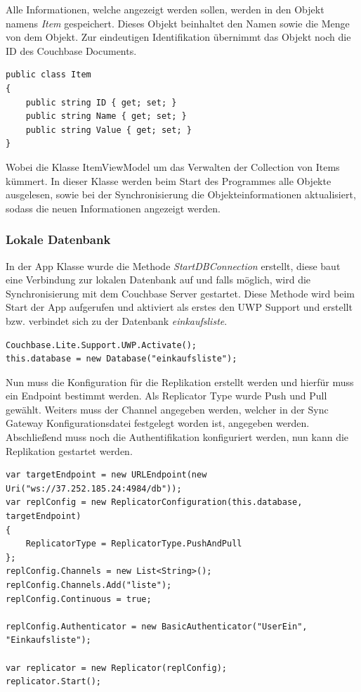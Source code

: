 Alle Informationen, welche angezeigt werden sollen, werden in den Objekt namens \textit{Item} gespeichert. Dieses Objekt beinhaltet den Namen sowie die Menge von dem Objekt. Zur eindeutigen Identifikation übernimmt das Objekt noch die ID des Couchbase Documents.

\begin{verbatim}
public class Item
{
	public string ID { get; set; }
	public string Name { get; set; }
	public string Value { get; set; }
}
\end{verbatim}

Wobei die Klasse ItemViewModel um das Verwalten der Collection von Items kümmert. In dieser Klasse werden beim Start des Programmes alle Objekte ausgelesen, sowie bei der Synchronisierung die Objekteinformationen aktualisiert, sodass die neuen Informationen angezeigt werden. \cite{listview}

\subsubsection{Lokale Datenbank}

In der App Klasse wurde die Methode \textit{StartDBConnection} erstellt, diese baut eine Verbindung zur lokalen Datenbank auf und falls möglich, wird die Synchronisierung mit dem Couchbase Server gestartet. Diese Methode wird beim Start der App aufgerufen und aktiviert als erstes den UWP Support und erstellt bzw. verbindet sich zu der Datenbank \textit{einkaufsliste}.


\begin{verbatim}
Couchbase.Lite.Support.UWP.Activate();
this.database = new Database("einkaufsliste");
\end{verbatim}

Nun muss die Konfiguration für die Replikation erstellt werden und hierfür muss ein Endpoint bestimmt werden. Als Replicator Type wurde Push und Pull gewählt. Weiters muss der Channel angegeben werden, welcher in der Sync Gateway Konfigurationsdatei festgelegt worden ist, angegeben werden. Abschließend muss noch die Authentifikation konfiguriert werden, nun kann die Replikation gestartet werden. \cite{couchbasegettingstarted}

\begin{verbatim}
var targetEndpoint = new URLEndpoint(new Uri("ws://37.252.185.24:4984/db"));
var replConfig = new ReplicatorConfiguration(this.database, targetEndpoint)
{
	ReplicatorType = ReplicatorType.PushAndPull
};
replConfig.Channels = new List<String>();
replConfig.Channels.Add("liste");
replConfig.Continuous = true;

replConfig.Authenticator = new BasicAuthenticator("UserEin", "Einkaufsliste");

var replicator = new Replicator(replConfig);
replicator.Start(); 
\end{verbatim}

